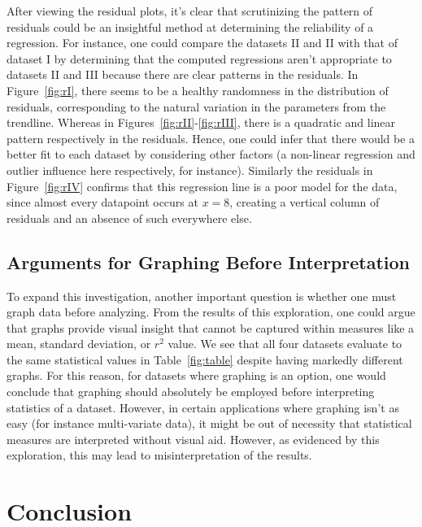 \documentclass[11pt,a4paper]{article}
\begin{document}
\linebreak
After viewing the residual plots, it's clear that scrutinizing the pattern of residuals could be an insightful method at determining the reliability of a regression. For instance, one could compare the  datasets II and II with that of dataset I by determining that the computed regressions aren't appropriate to datasets II and III because there are clear patterns in the residuals. In Figure~\ref{fig:rI}, there seems to be a healthy randomness in the distribution of residuals, corresponding to the natural variation in the parameters from the trendline. Whereas in Figures~\ref{fig:rII}-\ref{fig:rIII}, there is a quadratic and linear pattern respectively in the residuals. Hence, one could infer that there would be a better fit to each dataset by considering other factors (a non-linear regression and outlier influence here respectively, for instance). Similarly the residuals in Figure~\ref{fig:rIV} confirms that this regression line is a poor model for the data, since almost every datapoint occurs at $x = 8$, creating a vertical column of residuals and an absence of such everywhere else.

\subsection{Arguments for Graphing Before Interpretation}

To expand this investigation, another important question is whether one must graph data before analyzing. From the results of this exploration, one could argue that graphs provide visual insight that cannot be captured within measures like a mean, standard deviation, or $r^2$ value. We see that all four datasets evaluate to the same statistical values in Table~\ref{fig:table} despite having  markedly different graphs. For this reason, for datasets where graphing is an option, one would conclude that graphing should absolutely be employed before interpreting statistics of a dataset. However, in certain applications where graphing isn't as easy (for instance multi-variate data), it might be out of necessity that statistical measures are interpreted without visual aid. However, as evidenced by this exploration, this may lead to misinterpretation of the results.

\section{Conclusion}
\end{document}
